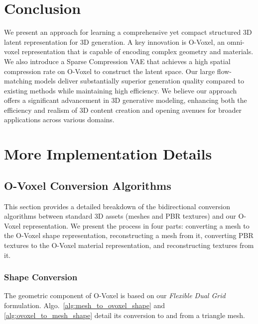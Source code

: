 \documentclass[10pt,twocolumn,letterpaper]{article}
\begin{document}
\section{Conclusion}\label{sec:conclusion}
We present an approach for learning a comprehensive yet compact structured 3D latent representation for 3D generation. A key innovation is O-Voxel, an omni-voxel representation that is capable of encoding complex geometry and materials. We also introduce a Sparse Compression VAE that achieves a high spatial compression rate on O-Voxel to construct the latent space. Our large flow-matching models deliver substantially superior generation quality  compared to existing methods while maintaining high efficiency. We believe our approach offers a significant advancement in 3D generative modeling, enhancing both the efficiency and realism of 3D content creation and opening avenues for broader applications across various domains.

{\small


}


\clearpage
\appendix
{}
\setcounter{page}{1}

\section{More Implementation Details}

\subsection{O-Voxel Conversion Algorithms}

This section provides a detailed breakdown of the bidirectional conversion algorithms between standard 3D assets (meshes and PBR textures) and our O-Voxel representation. We present the process in four parts: converting a mesh to the O-Voxel shape representation, reconstructing a mesh from it, converting PBR textures to the O-Voxel material representation, and reconstructing textures from it.

\subsubsection{Shape Conversion}

The geometric component of O-Voxel is based on our \emph{Flexible Dual Grid} formulation. Algo.~\ref{alg:mesh_to_ovoxel_shape} and \ref{alg:ovoxel_to_mesh_shape} detail its conversion to and from a triangle mesh.
\end{document}
